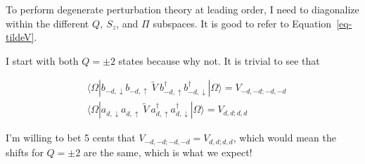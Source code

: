 \documentclass[
  letterpaper,
  DIV=11,
  numbers=noendperiod]{scrartcl}
\begin{document}
To perform degenerate perturbation theory at leading order, I need to
diagonalize within the different \(Q,\ S_z\), and \(\Pi\) subspaces. It
is good to refer to Equation~\ref{eq-tildeV}.

\begin{tcolorbox}[enhanced jigsaw, arc=.35mm, bottomrule=.15mm, bottomtitle=1mm, breakable, colback=white, colbacktitle=quarto-callout-note-color!10!white, colframe=quarto-callout-note-color-frame, coltitle=black, left=2mm, leftrule=.75mm, opacityback=0, opacitybacktitle=0.6, rightrule=.15mm, title={\(Q=\pm2\)}, titlerule=0mm, toprule=.15mm, toptitle=1mm]

I start with both \(Q=\pm2\) states because why not. It is trivial to
see that

\begin{align}
& \langle \Omega|b^{}_{-d,\downarrow}b^{}_{-d,\uparrow}\ \tilde V\ b^\dagger_{-d,\uparrow}b^\dagger_{-d,\downarrow}|\Omega\rangle =V_{-d,-d;-d,-d}\\
& \langle \Omega|a^{}_{d,\downarrow}a^{}_{d,\uparrow}\ \tilde V\ a^\dagger_{d,\uparrow}a^\dagger_{d,\downarrow}|\Omega\rangle =V_{d,d;d,d}
\end{align}

I'm willing to bet 5 cents that \(V_{-d,-d;-d,-d}=V_{d,d;d,d}\), which
would mean the shifts for \(Q=\pm 2\) are the same, which is what we
expect!

\end{tcolorbox}
\end{document}
